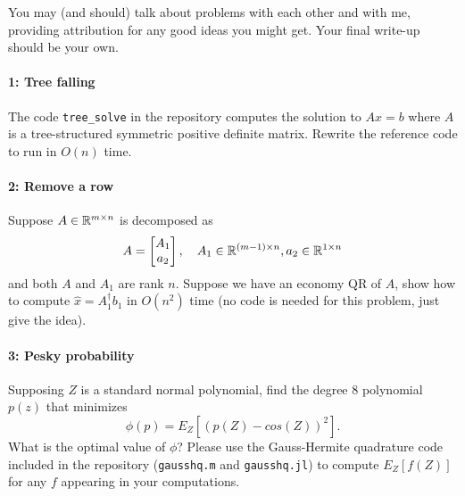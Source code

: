 \documentclass[12pt, leqno]{article} %
\begin{document}

You may (and should) talk about problems with each other and with me,
providing attribution for any good ideas you might get.  Your final
write-up should be your own.


\paragraph*{1: Tree falling}
The code {\tt tree\_solve} in the repository computes the solution to
$Ax = b$ where $A$ is a tree-structured symmetric positive definite
matrix.  Rewrite the reference code to run in $O(n)$ time.

\paragraph*{2: Remove a row}
Suppose $A \in \mathbb{R}^{m \times n}$ is decomposed as
\[
  A = \begin{bmatrix} A_1 \\ a_2 \end{bmatrix}, \quad
  A_1 \in \mathbb{R}^{(m-1) \times n}, a_2 \in \mathbb{R}^{1 \times n}
\]
and both $A$ and $A_1$ are rank $n$.
Suppose we have an economy QR of $A$, show how to compute
$\hat{x} = A_1^\dagger b_1$ in $O(n^2)$ time (no code is needed
for this problem, just give the idea).

\paragraph*{3: Pesky probability}
Supposing $Z$ is a standard normal polynomial, find the degree 8
polynomial $p(z)$ that minimizes
\[
  \phi(p) = E_Z[(p(Z)-cos(Z))^2].
\]
What is the optimal value of $\phi$?  Please use the Gauss-Hermite
quadrature code included in the repository ({\tt gausshq.m} and
{\tt gausshq.jl}) to compute $E_Z[f(Z)]$ for any $f$ appearing in your
computations.
\end{document}
